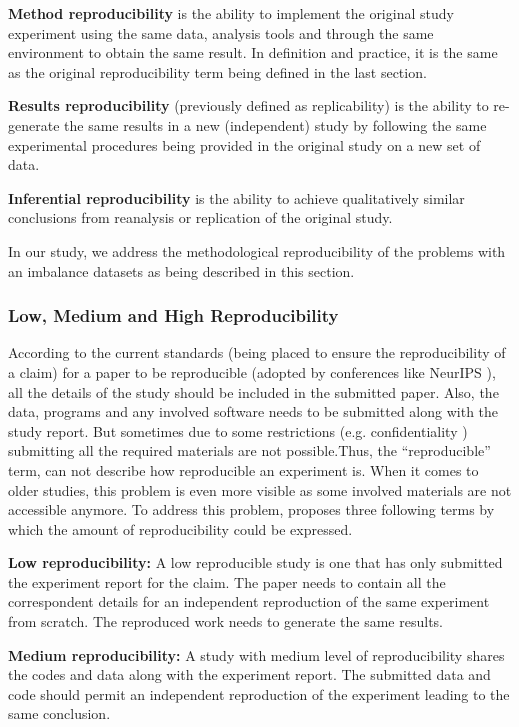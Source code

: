 \textbf{Method reproducibility} is the ability to implement the original study experiment using the same data, analysis tools and 
through the same environment to obtain the same result. In definition and practice, it is the same as the original 
reproducibility term being defined in the last section.

\textbf{Results reproducibility} (previously defined as replicability) is the ability to re-generate the same results in a new 
(independent) study by following the same experimental procedures being provided in the original study on a new set of data.

\textbf{Inferential reproducibility} is the ability to achieve qualitatively similar conclusions from reanalysis or replication of 
the original study.

In our study, we address the methodological reproducibility of the problems with an imbalance datasets as being described in 
this section.

\subsubsection{Low, Medium and High Reproducibility}
According to the current standards (being placed to ensure the reproducibility of a claim) for a paper to be 
reproducible (adopted by conferences like NeurIPS \cite{pineau_improving_2020}), all the details of the study should be 
included in the submitted paper. Also, the data, programs and any involved  software needs to be submitted along with 
the study report. But sometimes due to some restrictions (e.g. confidentiality \cite{dwork_fienberg_2018}) submitting all 
the required materials are not possible.Thus, the “reproducible” term, can not describe how reproducible an experiment is. 
When it comes to older studies, this problem is even more visible as some involved materials are not accessible anymore.
 To address this problem, \cite{tatman_practical_2018} proposes three following terms by which the amount of 
 reproducibility could be expressed.

\textbf{Low reproducibility:} A low reproducible study is one that has only submitted the experiment report for the claim. 
The paper needs to contain all the correspondent details for an independent reproduction of the same experiment from scratch. 
The reproduced work needs to generate the same results.

\textbf{Medium reproducibility:} A study with medium level of reproducibility shares the codes and data along with the 
experiment report. The submitted data and code should permit an independent reproduction of the experiment leading to 
the same conclusion.

